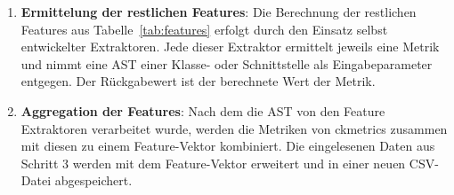 \begin{enumerate}
    \item \textbf{Ermittelung der restlichen Features}: Die Berechnung der restlichen Features aus Tabelle~\ref{tab:features} erfolgt durch den Einsatz selbst entwickelter Extraktoren. Jede dieser Extraktor ermittelt jeweils eine Metrik und nimmt eine AST einer Klasse- oder Schnittstelle als Eingabeparameter entgegen. Der Rückgabewert ist der berechnete Wert der Metrik.
    \item \textbf{Aggregation der Features}: Nach dem die AST von den Feature Extraktoren verarbeitet wurde, werden die Metriken von ckmetrics zusammen mit diesen zu einem Feature-Vektor kombiniert. Die eingelesenen Daten aus Schritt 3 werden mit dem Feature-Vektor erweitert und in einer neuen CSV-Datei abgespeichert.
\end{enumerate}
 